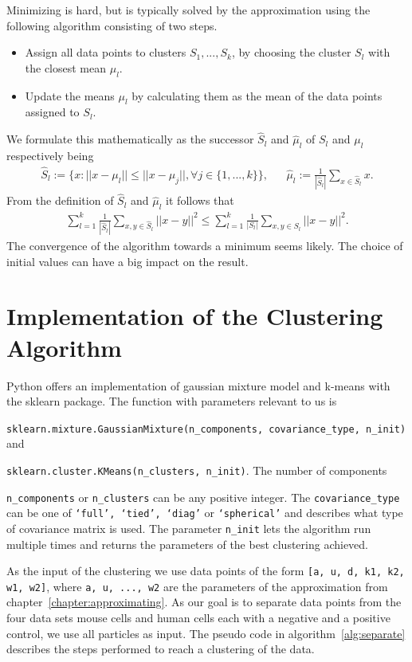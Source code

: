 Minimizing is hard, but is typically solved by the approximation using the following algorithm consisting of two steps.

\begin{itemize}
	\item Assign all data points to clusters $S_1, ..., S_k$, by choosing the cluster $S_l$ with the closest mean $\mu_l$.
	\item Update the means $\mu_l$ by calculating them as the mean of the data points assigned to $S_l$.
\end{itemize}
We formulate this mathematically as the successor $\hat{S}_l$ and $\hat{\mu}_l$ of $S_l$ and $\mu_l$ respectively being
\begin{align*}
	\hat{S}_l := \{x: ||x-\mu_l|| \leq ||x-\mu_j||, \forall j \in \{1, ..., k\} \}, &&
	\hat{\mu}_l := \frac{1}{|\hat{S}_l|} \sum_{x \in \hat{S}_l} x.
\end{align*}
From the definition of $\hat{S}_l$ and $\hat{\mu}_l$ it follows that
\begin{align*}
	\sum_{l=1}^{k} \frac{1}{|\hat{S}_l|} \sum_{x, y \in \hat{S}_l} ||x-y||^2 \leq \sum_{l=1}^{k} \frac{1}{|S_l|} \sum_{x, y \in S_l} ||x-y||^2.
\end{align*}
The convergence of the algorithm towards a minimum seems likely. The choice of initial values can have a big impact on the result.

\section{Implementation of the Clustering Algorithm}

Python offers an implementation of gaussian mixture model and k-means with the sklearn package. The function with parameters relevant to us is

\noindent
\texttt{sklearn.mixture.GaussianMixture(n\_components, covariance\_type, n\_init)} and

\noindent
\texttt{sklearn.cluster.KMeans(n\_clusters, n\_init)}. The number of components

\noindent
\texttt{n\_components} or \texttt{n\_clusters} can be any positive integer. The \texttt{covariance\_type} can be one of \texttt{‘full’, ‘tied’, ‘diag’} or \texttt{‘spherical’} and describes what type of covariance matrix is used. The parameter \texttt{n\_init} lets the algorithm run multiple times and returns the parameters of the best clustering achieved.

As the input of the clustering we use data points of the form \mbox{\texttt{[a, u, d, k1, k2, w1, w2]}}, where \texttt{a, u, ..., w2} are the parameters of the approximation from chapter~\ref{chapter:approximating}. As our goal is to separate data points from the four data sets mouse cells and human cells each with a negative and a positive control, we use all particles as input. The pseudo code in algorithm~\ref{alg:separate} describes the steps performed to reach a clustering of the data.

